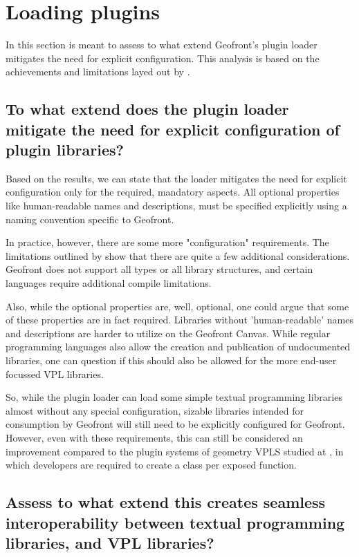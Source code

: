 \section{Loading plugins}
\label{sec:analyses:loading}

In this section is meant to assess to what extend Geofront's plugin loader mitigates the need for explicit configuration.
This analysis is based on the achievements and limitations layed out by .

\subsection*{To what extend does the plugin loader mitigate the need for explicit configuration of plugin libraries?}

Based on the results, we can state that the loader mitigates the need for explicit configuration only for the required, mandatory aspects. 
All optional properties like human-readable names and descriptions, must be specified explicitly using a naming convention specific to Geofront. 

In practice, however, there are some more "configuration" requirements. 
The limitations outlined by  show that there are quite a few additional considerations. 
Geofront does not support all types or all library structures, and certain languages require additional compile limitations.

Also, while the optional properties are, well, optional, one could argue that some of these properties are in fact required. 
Libraries without 'human-readable' names and descriptions are harder to utilize on the Geofront Canvas.
While regular programming languages also allow the creation and publication of undocumented libraries, one can question if this should also be allowed for the more end-user focussed VPL libraries.

So, while the plugin loader can load some simple textual programming libraries almost without any special configuration, sizable libraries intended for consumption by Geofront will still need to be explicitly configured for Geofront.
However, even with these requirements, this can still be considered an improvement compared to the plugin systems of geometry VPLS studied at , 
in which developers are required to create a class per exposed function.

\subsection*{Assess to what extend this creates seamless interoperability between textual programming libraries, and VPL libraries?}

